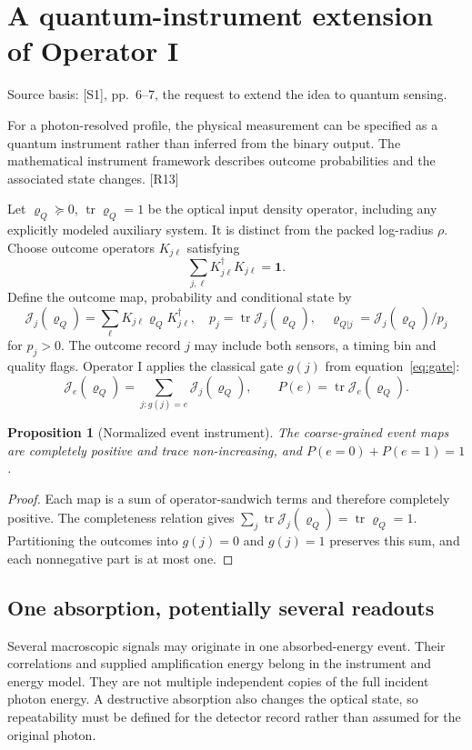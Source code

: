\documentclass[10pt,a4paper]{article}
\numberwithin{equation}{section}
\newtheorem{proposition}{Proposition}[section]
\newcommand{\src}[1]{\textcolor{muted}{\footnotesize Source basis: #1.}}
\newcommand{\newpart}{\clearpage}
\DeclareMathOperator{\tr}{tr}
\begin{document}
\newpart
\section{A quantum-instrument extension of Operator I}
\label{sec:quantum}
\src{[S1], pp.~6--7, the request to extend the idea to quantum sensing}

For a photon-resolved profile, the physical measurement can be specified as a quantum instrument rather than inferred from the binary output. The mathematical instrument framework describes outcome probabilities and the associated state changes. [R13]

Let $\varrho_Q\succeq0$, $\tr\varrho_Q=1$ be the optical input density operator, including any explicitly modeled auxiliary system. It is distinct from the packed log-radius $\rho$. Choose outcome operators $K_{j\ell}$ satisfying
\begin{equation}
\sum_{j,\ell}K_{j\ell}^{\dagger}K_{j\ell}=\bm1.
\end{equation}
Define the outcome map, probability and conditional state by
\begin{equation}
\mathcal J_j(\varrho_Q)=\sum_\ell K_{j\ell}\varrho_QK_{j\ell}^{\dagger},
\quad p_j=\tr\mathcal J_j(\varrho_Q),
\quad\varrho_{Q|j}=\mathcal J_j(\varrho_Q)/p_j
\end{equation}
for $p_j>0$. The outcome record $j$ may include both sensors, a timing bin and quality flags. Operator I applies the classical gate $g(j)$ from equation~\eqref{eq:gate}:
\begin{equation}
\mathcal J_{e}(\varrho_Q)=\sum_{j:g(j)=e}\mathcal J_j(\varrho_Q),
\qquad P(e)=\tr\mathcal J_e(\varrho_Q).
\end{equation}

\begin{proposition}[Normalized event instrument]
The coarse-grained event maps are completely positive and trace non-increasing, and $P(e=0)+P(e=1)=1$.
\end{proposition}
\begin{proof}
Each map is a sum of operator-sandwich terms and therefore completely positive. The completeness relation gives $\sum_j\tr\mathcal J_j(\varrho_Q)=\tr\varrho_Q=1$. Partitioning the outcomes into $g(j)=0$ and $g(j)=1$ preserves this sum, and each nonnegative part is at most one.
\end{proof}

\subsection*{One absorption, potentially several readouts}
Several macroscopic signals may originate in one absorbed-energy event. Their correlations and supplied amplification energy belong in the instrument and energy model. They are not multiple independent copies of the full incident photon energy. A destructive absorption also changes the optical state, so repeatability must be defined for the detector record rather than assumed for the original photon.
\end{document}
